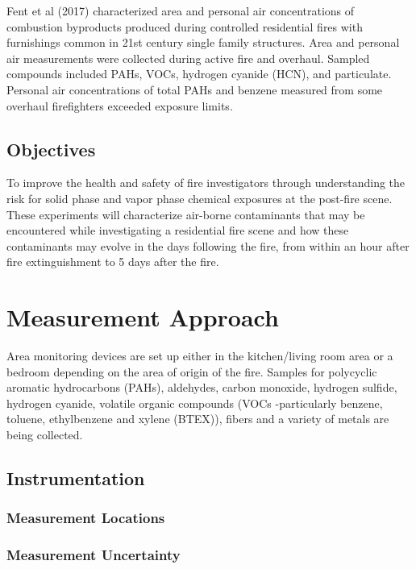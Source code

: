 \documentclass[12pt,oneside]{book}
\begin{document}
Fent et al (2017) characterized area and personal air concentrations of combustion byproducts produced during controlled residential fires with furnishings common in 21st century single family structures. Area and personal air measurements were collected during active fire and overhaul. Sampled compounds included PAHs, VOCs, hydrogen cyanide (HCN), and particulate. Personal air concentrations of total PAHs and benzene measured from some overhaul firefighters exceeded exposure limits.

\section{Objectives}

To improve the health and safety of fire investigators through understanding the risk for solid phase and vapor phase chemical exposures at the post-fire scene.  These experiments will characterize air-borne contaminants that may be encountered while investigating a residential fire scene and how these contaminants may evolve in the days following the fire, from within an hour after fire extinguishment to 5 days after the fire.          


\chapter{Measurement Approach}

Area monitoring devices are set up either in the kitchen/living room area or a bedroom depending on the area of origin of the fire.  Samples for polycyclic aromatic hydrocarbons (PAHs), aldehydes, carbon monoxide, hydrogen sulfide, hydrogen cyanide, volatile organic compounds (VOCs -particularly benzene, toluene, ethylbenzene and xylene (BTEX)), fibers and a variety of metals are being collected.  

\section{Instrumentation}
\label{sec:instrument}

\subsection{Measurement Locations}
\label{subsec:measure_locs}

\subsection{Measurement Uncertainty}
\label{subsec:uncertainty}
\end{document}
